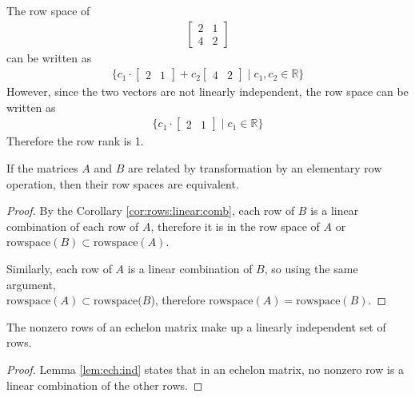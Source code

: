 \vfill

\begin{example}
The row space of 
%
\begin{align*}
\begin{bmatrix}
2 & 1 \\
4 & 2 
\end{bmatrix}
\end{align*}
can be written as
%
\begin{align*}
\{ c_1 \cdot \begin{bmatrix}
2 & 1 
\end{bmatrix} + c_2 \begin{bmatrix}
4 & 2 
\end{bmatrix} \; | \; c_1, c_2 \in \mathbb{R} \}
\end{align*}
However, since the two vectors are not linearly independent, the row space can be written as
%
\begin{align*}
\{ c_1 \cdot \begin{bmatrix}
2 & 1 
\end{bmatrix}\; | \; c_1 \in \mathbb{R} \}
\end{align*}
Therefore the row rank is 1.  

\end{example}


\begin{lemma}
If the matrices $A$ and $B$ are related by transformation by an elementary row operation, then their row spaces are equivalent.  
\end{lemma}

\begin{proof}
By the Corollary \ref{cor:rows:linear:comb}, each row of $B$ is a linear combination of each row of $A$, therefore it is in the row space of $A$ or $\text{rowspace}(B) \subset \text{rowspace}(A)$.  

Similarly, each row of $A$ is a linear combination of $B$, so using the same argument, \\ $\text{rowspace}(A) \subset \text{rowspace}(B$), therefore $\text{rowspace}(A)=\text{rowspace}(B)$.  
\end{proof}


\begin{lemma}
The nonzero rows of an echelon matrix make up a linearly independent set of rows. 
\end{lemma}

\begin{proof}
Lemma \ref{lem:ech:ind} states that in an echelon matrix, no nonzero row is a linear combination of the other rows. 
\end{proof}

